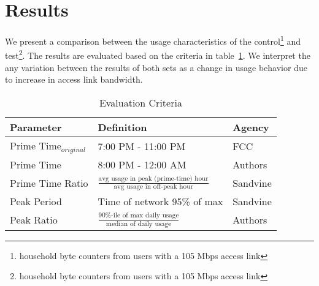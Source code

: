 \section{Results}
\label{sec:results}


We present a comparison between the usage characteristics of the control\footnote{household byte counters from users with a 105 Mbps access link} and test\footnote{household byte counters from users with a 105 Mbps access link}. The results are evaluated based on the criteria in table~\ref{tab:eval-criteria}. We interpret the any variation between the results of both sets as a change in usage behavior due to increase in access link bandwidth.

\begin{table}[ht!]
\small 
\begin{tabular}{|l|l|l|}
\hline
\textbf{Parameter}        & \textbf{Definition}                                                                     & \textbf{Agency}  \\ \hline
Prime Time$_{original}$       & 7:00 PM - 11:00 PM                                                             & FCC       \\
Prime Time       & 8:00 PM - 12:00 AM                                                             & Authors       \\

Prime Time Ratio & \( \frac{ \text{avg usage in peak (prime-time) hour}}{ \text{avg usage in off-peak hour}}\) & Sandvine  \\
Peak Period      & Time of network 95\% of max                                              & Sandvine \\
Peak Ratio       & \(\frac{\text{90\%-ile of max daily usage}}{\text{median of daily usage}}\)                & Authors \\\hline
\end{tabular}
\caption{Evaluation Criteria}
\label{tab:eval-criteria}
\end{table}






%